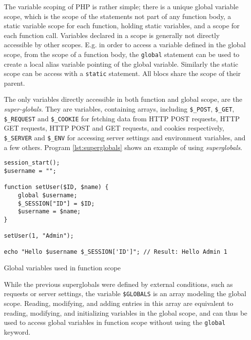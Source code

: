 The variable scoping of PHP is rather simple; there is a unique global variable scope, which is the scope of the statements not part of any function body, a static variable scope for each function, holding static variables, and a scope for each function call. Variables declared in a scope is generally not directly accessible by other scopes. E.g. in order to access a variable defined in the global scope, from the scope of a function body, the \texttt{global} statement can be used to create a local alias variable pointing of the global variable. Similarly the static scope can be access with a \texttt{static} statement. All blocs share the scope of their parent.

The only variables directly accessible in both function and global scope, are the \emph{super-globals}. They are variables, containing arrays, including \texttt{\$\_POST}, \texttt{\$\_GET}, \texttt{\$\_REQUEST} and \texttt{\$\_COOKIE} for fetching data from HTTP POST requests, HTTP GET requests, HTTP POST and GET requests, and cookies respectively, \texttt{\$\_SERVER} and \texttt{\$\_ENV} for accessing server settings and environment variables, and a few others. Program \ref{lst:superglobals} shows an example of using \emph{superglobals}.
\begin{program}
\begin{lstlisting}
session_start();
$username = "";

function setUser($ID, $name) {
    global $username;
    $_SESSION["ID"] = $ID;
    $username = $name;
}

setUser(1, "Admin");

echo "Hello $username $_SESSION['ID']"; // Result: Hello Admin 1
\end{lstlisting}
\caption{Global variables used in function scope}
\label{lst:superglobals}
\end{program}

While the previous superglobals were defined by external conditions, such as requests or server settings, the variable \texttt{\$GLOBALS} is an array modeling the global scope. Reading, modifying, and adding entries in this array are equivalent to reading, modifying, and initializing variables in the global scope, and can thus be used to access global variables in function scope without using the \texttt{global} keyword.


